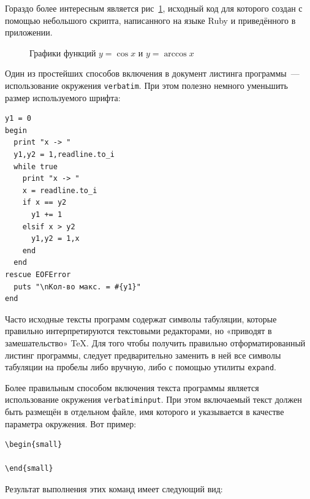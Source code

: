 Гораздо более интересным является рис~\ref{fig:cos_acos}, 
исходный код для которого создан с помощью небольшого скрипта,
написанного на языке Ruby и приведённого в приложении.

\begin{figure}[ht!]
\begin{center}

\end{center}
\caption{Графики функций $y=\cos x$ и $y=\arccos x$}\label{fig:cos_acos}
\end{figure}

Один из простейших способов включения в документ листинга программы~--- 
использование окружения \verb|verbatim|. При этом полезно немного
уменьшить размер используемого шрифта:

\begin{small}
\begin{verbatim}
y1 = 0
begin
  print "x -> "
  y1,y2 = 1,readline.to_i
  while true
    print "x -> "
    x = readline.to_i
    if x == y2
      y1 += 1
    elsif x > y2
      y1,y2 = 1,x
    end
  end
rescue EOFError
  puts "\nКол-во макс. = #{y1}"
end
\end{verbatim}
\end{small}

Часто исходные тексты программ содержат символы табуляции, которые
правильно интерпретируются текстовыми редакторами, но «приводят в
замешательство» \TeX. Для того чтобы получить правильно отформатированный
листинг программы, следует предварительно заменить в ней все символы табуляции
на пробелы либо вручную, либо с помощью утилиты \verb|expand|.

Более правильным способом включения текста программы является использование
окружения \verb|verbatiminput|. При этом
включаемый текст должен быть размещён в отдельном файле, имя которого и
указывается в качестве параметра окружения. Вот пример:

\begin{small}
\begin{verbatim}
\begin{small}

\end{small}
\end{verbatim}
\end{small}

Результат выполнения этих команд имеет следующий вид:

\begin{small}

\end{small}
